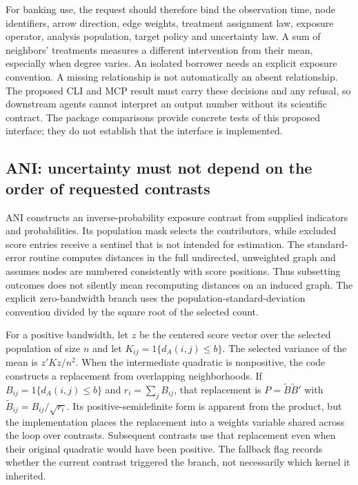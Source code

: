 For banking use, the request should therefore bind the observation time, node identifiers, arrow direction, edge weights, treatment assignment law, exposure operator, analysis population, target policy and uncertainty law. A sum of neighbors' treatments measures a different intervention from their mean, especially when degree varies. An isolated borrower needs an explicit exposure convention. A missing relationship is not automatically an absent relationship. The proposed CLI and MCP result must carry these decisions and any refusal, so downstream agents cannot interpret an output number without its scientific contract. The package comparisons provide concrete tests of this proposed interface; they do not establish that the interface is implemented.~\citep{exec25_pnet_choice}

\subsection{ANI: uncertainty must not depend on the order of requested contrasts}

ANI constructs an inverse-probability exposure contrast from supplied indicators and probabilities. Its population mask selects the contributors, while excluded score entries receive a sentinel that is not intended for estimation. The standard-error routine computes distances in the full undirected, unweighted graph and assumes nodes are numbered consistently with score positions. Thus subsetting outcomes does not silently mean recomputing distances on an induced graph. The explicit zero-bandwidth branch uses the population-standard-deviation convention divided by the square root of the selected count.~\citep{exec25_pnet_ani}

For a positive bandwidth, let $z$ be the centered score vector over the selected population of size $n$ and let $K_{ij}=1\{d_A(i,j)\leq b\}$. The selected variance of the mean is $z'Kz/n^2$. When the intermediate quadratic is nonpositive, the code constructs a replacement from overlapping neighborhoods. If $B_{ij}=1\{d_A(i,j)\leq b\}$ and $r_i=\sum_jB_{ij}$, that replacement is $P=\widetilde B\widetilde B'$ with $\widetilde B_{ij}=B_{ij}/\sqrt{r_i}$. Its positive-semidefinite form is apparent from the product, but the implementation places the replacement into a weights variable shared across the loop over contrasts. Subsequent contrasts use that replacement even when their original quadratic would have been positive. The fallback flag records whether the current contrast triggered the branch, not necessarily which kernel it inherited.~\citep{exec25_pnet_ani}

